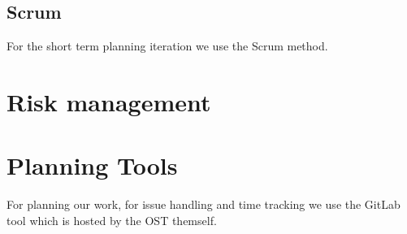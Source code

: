 \subsection{Scrum}
For the short term planning iteration we use the Scrum method.

\section{Risk management}


\section{Planning Tools}
For planning our work, for issue handling and time tracking we use the GitLab tool which is hosted by the OST themself.